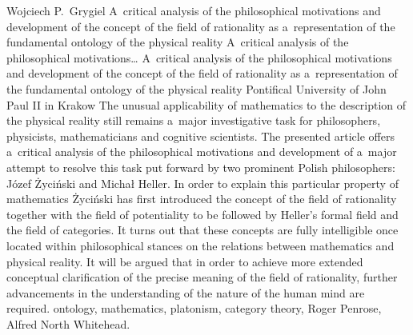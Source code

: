 \begin{artengenv}{Wojciech P.~Grygiel}
	{A~critical analysis of the philosophical motivations and development of the concept of the field of rationality as a~representation of the fundamental ontology of the physical reality}
	{A~critical analysis of the philosophical motivations\ldots}
	{A~critical analysis of the philosophical motivations and development of the concept of the field of rationality as a~representation of the fundamental ontology of the physical reality}
	{Pontifical University of John Paul II in Krakow}
	{The unusual applicability of mathematics to the description of the physical reality still remains a~major investigative task for philosophers, physicists, mathematicians and cognitive scientists. The presented article offers a~critical analysis of the philosophical motivations and development of a~major attempt to resolve this task put forward by two prominent Polish philosophers: Józef Życiński and Michał Heller. In order to explain this particular property of mathematics Życiński has first introduced the concept of the field of rationality together with the field of potentiality to be followed by Heller's formal field and the field of categories. It turns out that these concepts are fully intelligible once located within philosophical stances on the relations between mathematics and physical reality. It will be argued that in order to achieve more extended conceptual clarification of the precise meaning of the field of rationality, further advancements in the understanding of the nature of the human mind are required.}
	{ontology, mathematics, platonism, category theory, Roger Penrose, Alfred North Whitehead.}




\end{artengenv}

